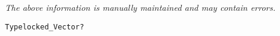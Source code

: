 \label{pkg:vector\_of\_eight\_byte\_floats}

{\tiny \it The above information is manually maintained and may contain errors.}
\begin{verbatim}
Typelocked_Vector?
\end{verbatim}
